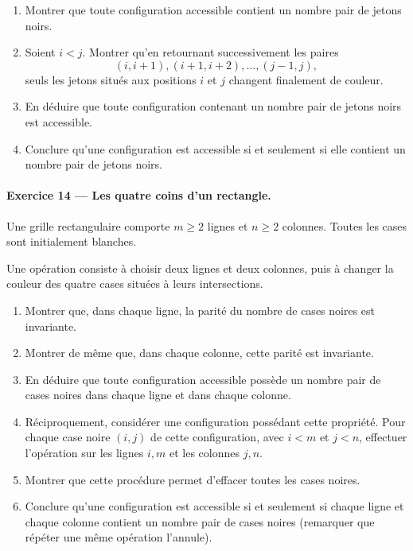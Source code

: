 \begin{enumerate}
    \item Montrer que toute configuration accessible contient un nombre pair
    de jetons noirs.

    \item Soient \(i<j\). Montrer qu'en retournant successivement les paires
    \[
    (i,i+1),(i+1,i+2),\dots,(j-1,j),
    \]
    seuls les jetons situés aux positions \(i\) et \(j\) changent finalement
    de couleur.

    \item En déduire que toute configuration contenant un nombre pair de
    jetons noirs est accessible.

    \item Conclure qu'une configuration est accessible si et seulement si elle
    contient un nombre pair de jetons noirs.
\end{enumerate}

\paragraph{Exercice 14 --- Les quatre coins d'un rectangle.}
Une grille rectangulaire comporte \(m\geq2\) lignes et \(n\geq2\) colonnes. Toutes les
cases sont initialement blanches.

Une opération consiste à choisir deux lignes et deux colonnes, puis à changer
la couleur des quatre cases situées à leurs intersections.

\begin{enumerate}
    \item Montrer que, dans chaque ligne, la parité du nombre de cases noires
    est invariante.

    \item Montrer de même que, dans chaque colonne, cette parité est invariante.

    \item En déduire que toute configuration accessible possède un nombre pair
    de cases noires dans chaque ligne et dans chaque colonne.

    \item Réciproquement, considérer une configuration possédant cette
    propriété. Pour chaque case noire \((i,j)\) de cette configuration, avec
    \(i<m\) et \(j<n\),
    effectuer l'opération sur les lignes \(i,m\) et les colonnes \(j,n\).

    \item Montrer que cette procédure permet d'effacer toutes les cases noires.

    \item Conclure qu'une configuration est accessible si et seulement si
    chaque ligne et chaque colonne contient un nombre pair de cases noires
    (remarquer que répéter une même opération l'annule).
\end{enumerate}

